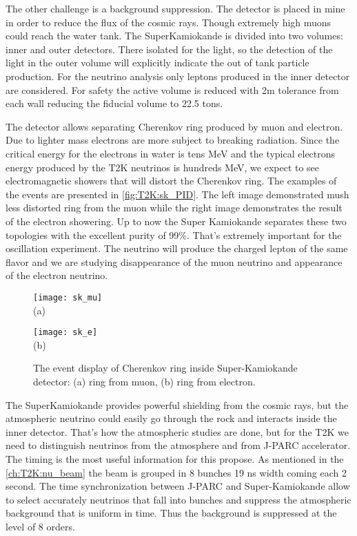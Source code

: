 \documentclass[../main.tex]{subfiles}
\begin{document}
The other challenge is a background suppression. The detector is placed in mine in order to reduce the flux of the cosmic rays. Though extremely high muons could reach the water tank. The SuperKamiokande is divided into two volumes: inner and outer detectors. There isolated for the light, so the detection of the light in the outer volume will explicitly indicate the out of tank particle production. For the neutrino analysis only leptons produced in the inner detector are considered. For safety the active volume is reduced with 2m tolerance from each wall reducing the fiducial volume to 22.5 tons.

The detector allows separating Cherenkov ring produced by muon and electron. Due to lighter mass electrons are more subject to breaking radiation. Since the critical energy for the electrons in water is tens MeV and the typical electrons energy produced by the T2K neutrinos is hundreds MeV, we expect to see electromagnetic showers that will distort the Cherenkov ring. The examples of the events are presented in \autoref{fig:T2K:sk_PID}. The left image demonstrated mush less distorted ring from the muon while the right image demonstrates the result of the electron showering. Up to now the Super Kamiokande separates these two topologies with the excellent purity of 99\%. That's extremely important for the oscillation experiment. The neutrino will produce the charged lepton of the same flavor and we are studying disappearance of the muon neutrino and appearance of the electron neutrino.

\begin{figure}[!ht]
  \centering
  \begin{minipage}{0.49\linewidth}
    \centering
    \texttt{[image: sk\_mu]} \\ (a)
  \end{minipage}
  \begin{minipage}{0.49\linewidth}
    \centering
    \texttt{[image: sk\_e]} \\ (b)
  \end{minipage}
    \caption{The event display of Cherenkov ring inside Super-Kamiokande detector: (a) ring from muon, (b) ring from electron.}
    \label{fig:T2K:sk_PID}
\end{figure}

The SuperKamiokande provides powerful shielding from the cosmic rays, but the atmospheric neutrino could easily go through the rock and interacts inside the inner detector. That's how the atmospheric studies are done, but for the T2K we need to distinguish neutrinos from the atmosphere and from J-PARC accelerator. The timing is the most useful information for this propose. As mentioned in the \autoref{ch:T2K:nu_beam} the beam is grouped in 8 bunches 19 ns width coming each 2 second. The time synchronization between J-PARC and Super-Kamiokande allow to select accurately neutrinos that fall into bunches and suppress the atmospheric background that is uniform in time. Thus the background is suppressed at the level of 8 orders.
\end{document}

